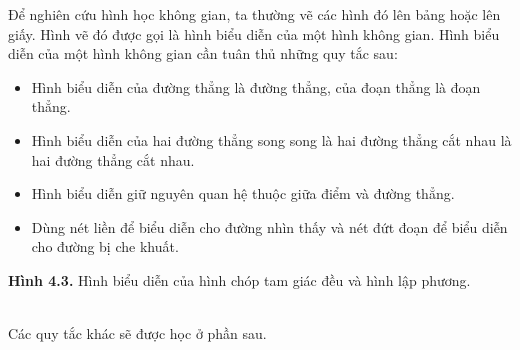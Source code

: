 \begin{note}
	Để nghiên cứu hình học không gian, ta thường vẽ các hình đó lên bảng hoặc lên giấy. Hình vẽ đó được gọi là hình biểu diễn của một hình không gian. Hình biểu diễn của một hình không gian cần tuân thủ những quy tắc sau:\\
	\begin{minipage}{0.6\textwidth}
		\begin{itemize}
			\item Hình biểu diễn của đường thẳng là đường thẳng, của đoạn thẳng là đoạn thẳng.
			\item Hình biểu diễn của hai đường thẳng song song là hai đường thẳng cắt nhau là hai đường thẳng cắt nhau.
			\item Hình biểu diễn giữ nguyên quan hệ thuộc giữa điểm và đường thẳng.
			\item Dùng nét liền để biểu diễn cho đường nhìn thấy và nét đứt đoạn để biểu diễn cho đường bị che khuất.
		\end{itemize}
	\end{minipage}
\hspace{1cm}
\begin{minipage}{0.3\textwidth}
\textbf{Hình 4.3.} Hình biểu diễn của hình chóp tam giác đều và hình lập phương.
		

\end{minipage}\\
	Các quy tắc khác sẽ được học ở phần sau.
\end{note}
